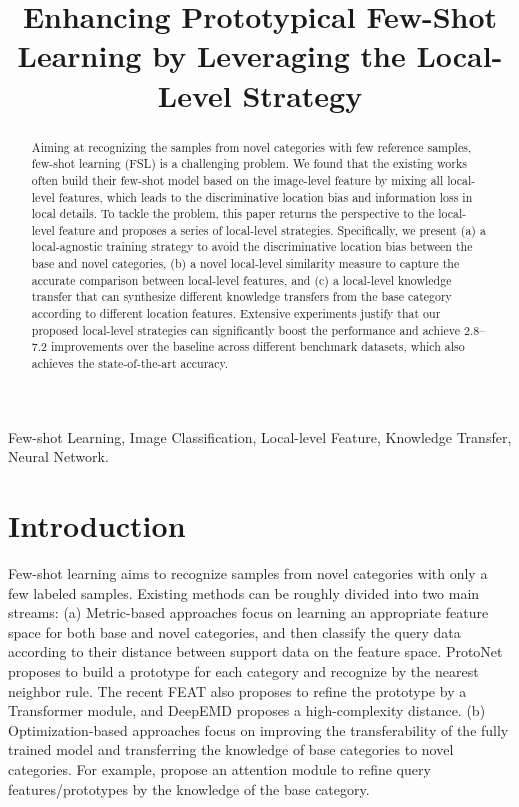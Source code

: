\documentclass{article}
\title{Enhancing Prototypical Few-Shot Learning by Leveraging the Local-Level Strategy}
\begin{document}
\maketitle
\begin{abstract}
Aiming at recognizing the samples from novel categories with few reference samples, few-shot learning (FSL) is a challenging problem. We found that the existing works often build their few-shot model based on the image-level feature by mixing all local-level features, which leads to the discriminative location bias and information loss in local details. To tackle the problem, this paper returns the perspective to the local-level feature and proposes a series of local-level strategies. Specifically, we present (a) a local-agnostic training strategy to avoid the discriminative location bias between the base and novel categories, (b) a novel local-level similarity measure to capture the accurate comparison between local-level features, and (c) a local-level knowledge transfer that can synthesize different knowledge transfers from the base category according to different location features. Extensive experiments justify that our proposed local-level strategies can significantly boost the performance and achieve 2.8–7.2 improvements over the baseline across different benchmark datasets, which also achieves the state-of-the-art accuracy.
\end{abstract}
\begin{keywords}
Few-shot Learning, Image Classification, Local-level Feature, Knowledge Transfer, Neural Network.
\end{keywords}
\section{Introduction}
\label{sec:intro}
Few-shot learning aims to recognize samples from novel categories with only a few labeled samples. Existing methods can be roughly divided into two main streams: (a) Metric-based approaches \cite{hou2019cross, kye2020transductive, snell2017prototypical, vinyals2016matching, zhang2020deepemd,wang2019simpleshot, multi-pro} focus on learning an appropriate feature space for both base and novel categories, and then classify the query data according to their distance between support data on the feature space. ProtoNet \cite{snell2017prototypical} proposes to build a prototype for each category and recognize by the nearest neighbor rule. The recent FEAT \cite{ye2020set} also proposes to refine the prototype by a Transformer module, and DeepEMD proposes a high-complexity distance. (b) Optimization-based approaches \cite{finn2017model, hu2020empirical, lee2019meta, gidaris2018dynamic, liu2019large} focus on improving the transferability of the fully trained model and transferring the knowledge of base categories to novel categories. For example, \cite{gidaris2018dynamic, liu2019large} propose an attention module to refine query features/prototypes by the knowledge of the base category.
\end{document}
